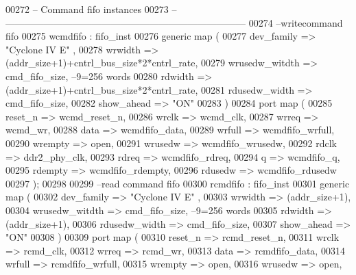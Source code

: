 \begin{DoxyCode}
00272 \textcolor{keyword}{-- Command fifo instances}
00273 \textcolor{keyword}{-- ---------------------------------------------------------------------------}
00274 \textcolor{keyword}{--writecommand fifo}
00275 wcmdfifo    : fifo_inst 
00276 \textcolor{keywordflow}{generic} \textcolor{keywordflow}{map} (
00277             dev_family          => \textcolor{keyword}{"Cyclone IV E"}  ,
00278             wrwidth             => \textcolor{vhdlchar}{(}addr\_size+1\textcolor{vhdlchar}{)}+cntrl\_bus\_size*2*cntrl\_rate,
00279             wrusedw_witdth      => cmd_fifo_size,\textcolor{keyword}{ --9=256 words }
00280             rdwidth             => \textcolor{vhdlchar}{(}addr\_size+1\textcolor{vhdlchar}{)}+cntrl\_bus\_size*2*cntrl\_rate,
00281             rdusedw_width       => cmd_fifo_size,
00282             show_ahead          => \textcolor{keyword}{"ON"}
00283 \textcolor{vhdlchar}{)}
00284 \textcolor{keywordflow}{port} \textcolor{keywordflow}{map} (
00285       reset_n       => wcmd_reset_n, 
00286       wrclk         => wcmd_clk, 
00287       wrreq         => wcmd_wr, 
00288       data          => wcmdfifo_data, 
00289       wrfull        => wcmdfifo_wrfull, 
00290         wrempty       => \textcolor{keywordflow}{open}, 
00291       wrusedw       => wcmdfifo_wrusedw, 
00292       rdclk          => ddr2_phy_clk, 
00293       rdreq         => wcmdfifo_rdreq, 
00294       q             => wcmdfifo_q, 
00295       rdempty       => wcmdfifo_rdempty, 
00296       rdusedw       => wcmdfifo_rdusedw   
00297 \textcolor{vhdlchar}{)};
00298 
00299 \textcolor{keyword}{--read command fifo}
00300 rcmdfifo    : fifo_inst 
00301 \textcolor{keywordflow}{generic} \textcolor{keywordflow}{map} (
00302             dev_family          => \textcolor{keyword}{"Cyclone IV E"}  ,
00303             wrwidth             => \textcolor{vhdlchar}{(}addr\_size+1\textcolor{vhdlchar}{)},
00304             wrusedw_witdth      => cmd_fifo_size,\textcolor{keyword}{ --9=256 words }
00305             rdwidth             => \textcolor{vhdlchar}{(}addr\_size+1\textcolor{vhdlchar}{)},
00306             rdusedw_width       => cmd_fifo_size,
00307             show_ahead          => \textcolor{keyword}{"ON"}
00308 \textcolor{vhdlchar}{)}
00309 \textcolor{keywordflow}{port} \textcolor{keywordflow}{map} (
00310       reset_n       => rcmd_reset_n, 
00311       wrclk         => rcmd_clk, 
00312       wrreq         => rcmd_wr, 
00313       data          => rcmdfifo_data, 
00314       wrfull        => rcmdfifo_wrfull, 
00315         wrempty       => \textcolor{keywordflow}{open}, 
00316       wrusedw       => \textcolor{keywordflow}{open}, 

\end{DoxyCode}
